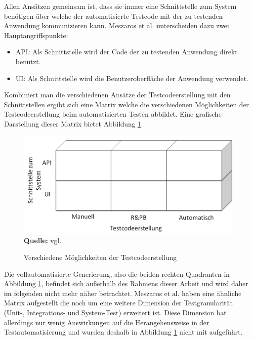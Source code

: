 Allen Ansätzen gemeinsam ist, dass sie immer eine Schnittstelle zum System benötigen über welche der automatisierte Testcode mit der zu testenden Anwendung kommunizieren kann.
Meszaros et al. unterscheiden dazu zwei Hauptangriffspunkte:
\begin{itemize}
\item API: Als Schnittstelle wird der Code der zu testenden Anwendung direkt benutzt.
\item 
UI: Als Schnittstelle wird die Benutzeroberfläche der Anwendung verwendet.
\end{itemize}

Kombiniert man die verschiedenen Ansätze der Testcodeerstellung mit den Schnittstellen ergibt sich eine Matrix welche die verschiedenen Möglichkeiten der Testcodeerstellung beim automatisierten Testen abbildet. Eine grafische Darstellung dieser Matrix bietet Abbildung \ref{fig:bereicheTestcodeerstellung}.


\begin{figure}[htb]
  \centering  
  \includegraphics[scale=0.7]{img/bereicheTestcodeerstellung.png}\\
  \footnotesize\sffamily\textbf{Quelle:} vgl. \cite{fewster_software_1999}
  \caption{Verschiedene Möglichkeiten der Testcodeerstellung}
  \label{fig:bereicheTestcodeerstellung}
\end{figure}

Die vollautomatisierte Generierung, also die beiden rechten Quadranten in Abbildung \ref{fig:bereicheTestcodeerstellung}, befindet sich außerhalb des Rahmens dieser Arbeit und wird daher im folgenden nicht mehr näher betrachtet.
Meszaros et al.  \cite{meszaros_agile_2003} haben eine ähnliche Matrix aufgestellt die noch um eine weitere Dimension der Testgranularität (Unit-, Integrations- und System-Test) erweitert ist. Diese Dimension hat allerdings nur wenig Auswirkungen auf die Herangehensweise in der Testautomatisierung und wurden deshalb in Abbildung \ref{fig:bereicheTestcodeerstellung} nicht mit aufgeführt.

